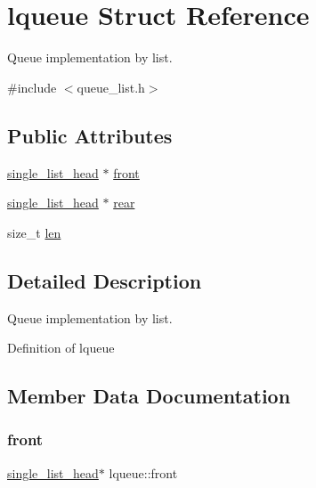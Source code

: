 \hypertarget{structlqueue}{}\section{lqueue Struct Reference}
\label{structlqueue}


Queue implementation by list.  




{\ttfamily \#include $<$queue\+\_\+list.\+h$>$}

\subsection*{Public Attributes}
\begin{DoxyCompactItemize}
\item 
\mbox{\hyperlink{structsingle__list__head}{single\+\_\+list\+\_\+head}} $\ast$ \mbox{\hyperlink{structlqueue_ab3e6f9e3fbc77eee0e7f9f1c3d2dd33c}{front}}
\item 
\mbox{\hyperlink{structsingle__list__head}{single\+\_\+list\+\_\+head}} $\ast$ \mbox{\hyperlink{structlqueue_a07f47d270480bb3432b8802cbca43082}{rear}}
\item 
size\+\_\+t \mbox{\hyperlink{structlqueue_acd0aa72a2935f5b25d10d86f4a869a7d}{len}}
\end{DoxyCompactItemize}


\subsection{Detailed Description}
Queue implementation by list. 

Definition of lqueue 

\subsection{Member Data Documentation}
\mbox{\label{structlqueue_ab3e6f9e3fbc77eee0e7f9f1c3d2dd33c}} 
\subsubsection{\texorpdfstring{front}{front}}
{\footnotesize\ttfamily \mbox{\hyperlink{structsingle__list__head}{single\+\_\+list\+\_\+head}}$\ast$ lqueue\+::front}

\mbox{\label{structlqueue_acd0aa72a2935f5b25d10d86f4a869a7d}} 
